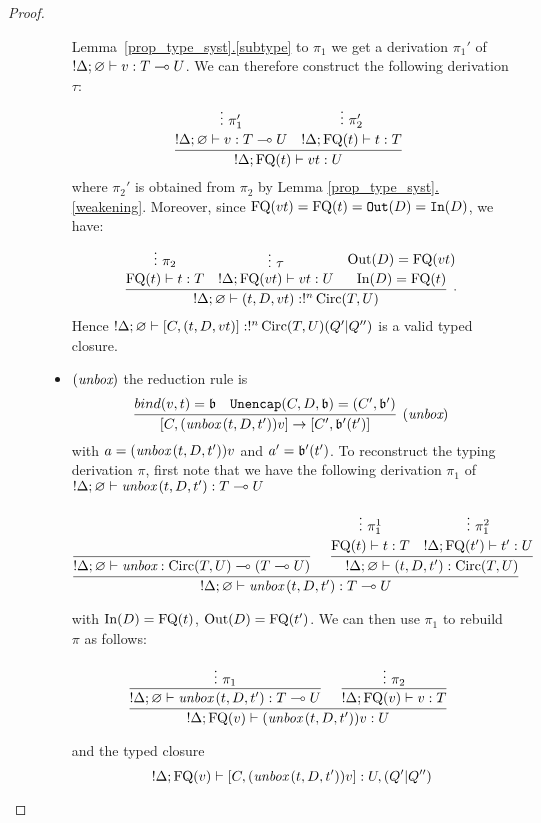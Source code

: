 \documentclass[twoside]{article}
\begin{document}
\begin{proof}
\begin{description}
\begin{itemize}
  Lemma~\hyperref[subtype]{\ref*{prop_type_syst}.\ref*{subtype}}
  to $\pi_1$ we get a derivation $\pi_1'$ of $!\Delta ;\varnothing\vdash v:T\multimap U$.
  We can therefore construct the following derivation $\tau$:
  \[
  \infer[]{!\Delta;\FQ(t)\entails vt : U}{
    \deduce[]{!\Delta ;\varnothing\entails v:T\loli U}{
      \vdots ~\pi_1'
    }
    &
    \deduce[]{!\Delta;\FQ(t)\entails t:T}{
      \vdots ~\pi_2'
    }
  }
  \]
  where $\pi_2'$ is obtained from $\pi_2$ by Lemma 
  \hyperref[weakening]{\ref*{prop_type_syst}.\ref*{weakening}}.
  Moreover, since $\mathop{\textrm{FQ}}\nolimits(vt)=\mathop{\textrm{FQ}}\nolimits(t)=\mathtt{Out}(D)=\mathtt{In}(D)$, 
  we have:
  \[
  \infer[.]{!\Delta;\varnothing \entails (t,D,vt):!^n\Circ(T,U)}{
    \deduce[]{\FQ(t)\entails t:T}{
      \vdots~\pi_2
    }
    &
    \deduce[]{!\Delta ; \FQ(vt)\entails vt:U}{
      \vdots~\tau
    } 
    &
    \deduce[]{\In(D)=\FQ(t) }{
      \Out(D)=\FQ(vt)
    }
  }
  \]  
  Hence $!\Delta ;\varnothing \vdash [C,(t,D,vt)]:!^n\mathop{\textrm{Circ}}\nolimits(T,U) (Q'|Q'')$ is 
  a valid typed closure.
  \item $(\mathop{\textit{unbox}}\nolimits)$ the reduction rule is
  \[
    \infer[(\unbox)]{[C,(\unbox\,(t,D,t'))v]\to [C',\binding'(t')]}{
      bind(v,t)=\binding 
      &
      \mathtt{Unencap}(C,D,\binding) = (C',\binding') 
    }
  \]
  with $a=(\mathop{\textit{unbox}}\nolimits\,(t,D,t'))v$ and $a'=\mathfrak{b}'(t')$. 
  To reconstruct the typing derivation $\pi$, first note 
  that we have the following derivation $\pi_1$ of    
  $!\Delta;\varnothing\vdash \mathop{\textit{unbox}}\nolimits\,(t,D,t'):T\multimap U$
  \begin{footnotesize}
  \[
    \infer[]{!\Delta;\varnothing\entails \unbox\,(t,D,t'):T\loli U}{
      \infer[]{!\Delta;\varnothing \entails \unbox:\Circ(T,U)\loli (T\loli U)}{
      }   
      &
      \infer[]{!\Delta ;\varnothing\entails (t,D,t'):\Circ(T,U)}{
        \deduce[]{\FQ(t)\entails t:T}{
          \vdots ~\pi_1^1
        }
        &
        \deduce[]{!\Delta;\FQ(t')\entails t':U}{
          \vdots ~\pi_1^2     
        }
      }
    }
    \]
    \end{footnotesize} 
  with $\mathop{\textrm{In}}\nolimits(D)=\mathop{\textrm{FQ}}\nolimits(t)$, $\mathop{\textrm{Out}}\nolimits(D)=\mathop{\textrm{FQ}}\nolimits(t')$. We can then use $\pi_1$ 
  to rebuild $\pi$ as follows:
  \begin{footnotesize}
  \[
  \infer[]{!\Delta; \FQ(v)\entails (\unbox\,(t,D,t'))v :U}{
    \infer[]{!\Delta;\varnothing\entails \unbox\,(t,D,t'):T\loli U}{
      \vdots~\pi_1            
    }
    &
    \infer[]{!\Delta ; \FQ(v)\entails v:T}{
      \vdots~\pi_2
    }
  }
  \]
  \end{footnotesize} 
  and the typed closure
  \[
  !\Delta; \mathop{\textrm{FQ}}\nolimits(v) \vdash [C,(\mathop{\textit{unbox}}\nolimits\,(t,D,t'))v] :U,(Q'|Q'')
\]
\end{itemize}
\end{description}
\end{proof}
\end{document}
